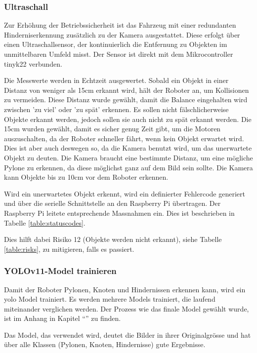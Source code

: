 \subsubsection{Ultraschall}
\label{ultraschall}

Zur Erhöhung der Betriebssicherheit ist das Fahrzeug mit einer redundanten Hinderniserkennung zusätzlich zu der Kamera ausgestattet. Diese erfolgt über einen Ultraschallsensor, der kontinuierlich die Entfernung zu Objekten im unmittelbaren Umfeld misst. Der Sensor ist direkt mit dem Mikrocontroller \gls{tinyk22} verbunden.

Die Messwerte werden in Echtzeit ausgewertet. Sobald ein Objekt in einer Distanz von weniger als 15cm erkannt wird, hält der Roboter an, um Kollisionen zu vermeiden. Diese Distanz wurde gewählt, damit die Balance eingehalten wird zwischen 'zu viel' oder 'zu spät' erkennen. Es sollen nicht fälschlicherweise Objekte erkannt werden, jedoch sollen sie auch nicht zu spät erkannt werden. Die 15cm wurden gewählt, damit es sicher genug Zeit gibt, um die Motoren auszuschalten, da der Roboter schneller fährt, wenn kein Objekt erwartet wird. Dies ist aber auch deswegen so, da die Kamera benutzt wird, um das unerwartete Objekt zu deuten. Die Kamera braucht eine bestimmte Distanz, um eine mögliche Pylone zu erkennen, da diese möglichst ganz auf dem Bild sein sollte. Die Kamera kann Objekte bis zu 10cm vor dem Roboter erkennen. 


Wird ein unerwartetes Objekt erkennt, wird ein definierter Fehlercode generiert und über die serielle Schnittstelle an den Raspberry Pi übertragen. Der Raspberry Pi leitete entsprechende Massnahmen ein. Dies ist beschrieben in Tabelle \ref{table:statuscodes}.

Dies hilft dabei Risiko 12 (Objekte werden nicht erkannt), siehe Tabelle \ref{table:risks}, zu mitigieren, falls es passiert.



\subsubsection{YOLOv11-Model trainieren}

Damit der Roboter Pylonen, Knoten und Hindernissen erkennen kann, wird ein \gls{yolo} Model trainiert.
Es werden mehrere Models trainiert, die laufend miteinander verglichen werden. Der Prozess wie das finale Model gewählt wurde, ist im Anhang in Kapitel ``'' zu finden.

Das Model, das verwendet wird, deutet die Bilder in ihrer Originalgrösse und hat über alle Klassen (Pylonen, Knoten, Hindernisse) gute Ergebnisse.

